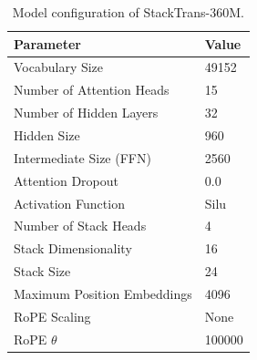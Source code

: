 \documentclass{article}
\DeclareRobustCommand{\method}{{\sc StackTrans}\xspace}
\begin{document}
\begin{table}[t]
\centering
\caption{Model configuration of \method-360M.}
\label{tab:model_config}
\begin{tabular}{ll}
\toprule
\textbf{Parameter} & \textbf{Value} \\
\midrule
Vocabulary Size & 49152 \\
Number of Attention Heads & 15 \\
Number of Hidden Layers & 32 \\
Hidden Size & 960 \\
Intermediate Size (FFN) & 2560 \\
Attention Dropout & 0.0 \\
Activation Function & Silu \\
\midrule
Number of Stack Heads & 4 \\
Stack Dimensionality & 16 \\
Stack Size & 24 \\
\midrule
Maximum Position Embeddings & 4096 \\
RoPE Scaling & None \\
RoPE $\theta$ & 100000 \\
\bottomrule
\end{tabular}
\end{table}
\end{document}
